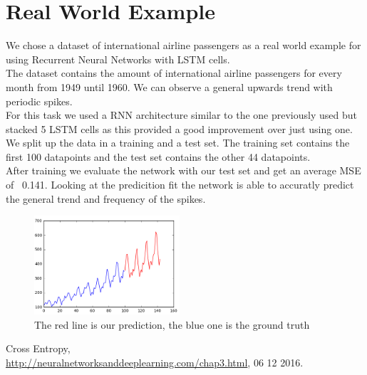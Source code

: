 \documentclass[twoside, twocolumn]{article}
\begin{document}
\section{Real World Example}

We chose a dataset of international airline passengers as a real world example for using Recurrent Neural Networks with LSTM cells. \\
The dataset contains the amount of international airline passengers for every month from 1949 until 1960. We can observe a general upwards trend with periodic spikes. \\
For this task we used a RNN architecture similar to the one previously used but stacked 5 LSTM cells as this provided a good improvement over just using one. \\
We split up the data in a training and a test set. The training set contains the first 100 datapoints and the test set contains the other 44 datapoints. \\
After training we evaluate the network with our test set and get an average MSE of ~0.141. Looking at the predicition fit the network is able to accuratly predict the general trend and frequency of the spikes.

\begin{figure}[htb]
\centering
	\includegraphics[width=0.48\textwidth]{rnn_plane_fit.png}
	\caption{The red line is our prediction, the blue one is the ground truth}
\end{figure}


\begin{thebibliography}{99} %

Cross Entropy,\\ \url{http://neuralnetworksanddeeplearning.com/chap3.html}, 06 12 2016.

\end{thebibliography}

\end{document}
